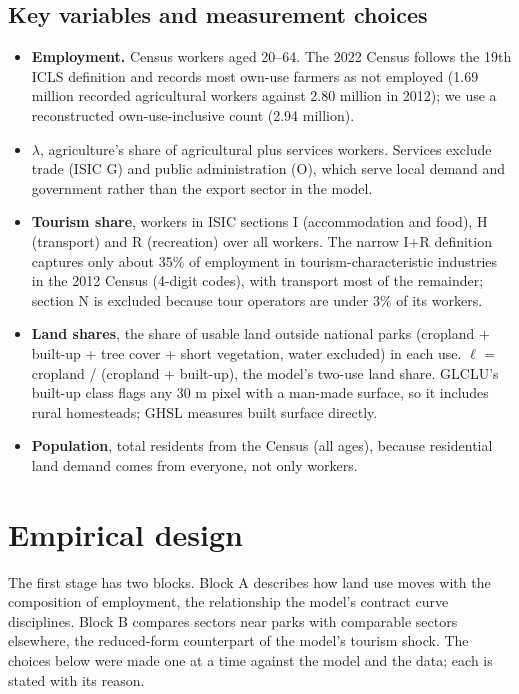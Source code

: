 \documentclass[11pt]{article}
\begin{document}
\subsection{Key variables and measurement choices}
\begin{itemize}
\item \textbf{Employment.} Census workers aged 20--64. The 2022 Census follows the 19th ICLS definition and records most own-use farmers as not employed (1.69 million recorded agricultural workers against 2.80 million in 2012); we use a reconstructed own-use-inclusive count (2.94 million).
\item \textbf{$\lambda$}, agriculture's share of agricultural plus services workers. Services exclude trade (ISIC G) and public administration (O), which serve local demand and government rather than the export sector in the model.
\item \textbf{Tourism share}, workers in ISIC sections I (accommodation and food), H (transport) and R (recreation) over all workers. The narrow I+R definition captures only about 35\% of employment in tourism-characteristic industries in the 2012 Census (4-digit codes), with transport most of the remainder; section N is excluded because tour operators are under 3\% of its workers.
\item \textbf{Land shares}, the share of usable land outside national parks (cropland + built-up + tree cover + short vegetation, water excluded) in each use. $\ell$ = cropland / (cropland + built-up), the model's two-use land share. GLCLU's built-up class flags any 30 m pixel with a man-made surface, so it includes rural homesteads; GHSL measures built surface directly.
\item \textbf{Population}, total residents from the Census (all ages), because residential land demand comes from everyone, not only workers.
\end{itemize}

\section{Empirical design}

The first stage has two blocks. Block A describes how land use moves with the composition of employment, the relationship the model's contract curve disciplines. Block B compares sectors near parks with comparable sectors elsewhere, the reduced-form counterpart of the model's tourism shock. The choices below were made one at a time against the model and the data; each is stated with its reason.
\end{document}
